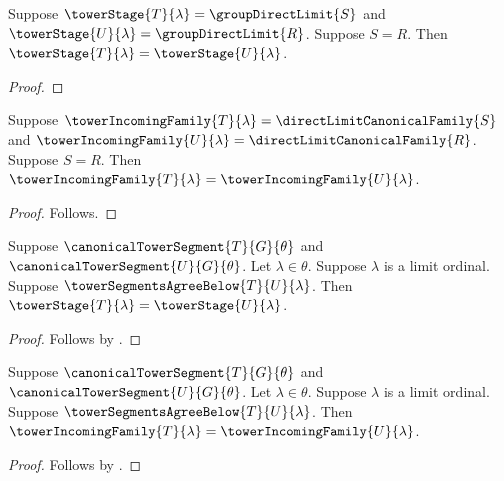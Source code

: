\begin{proposition}\label{tower_limit_stage_comparison_from_systems}
    Suppose $\towerStage{T}{\lambda}=\groupDirectLimit{S}$ and
        $\towerStage{U}{\lambda}=\groupDirectLimit{R}$.
    Suppose $S=R$.
    Then $\towerStage{T}{\lambda}=\towerStage{U}{\lambda}$.
\end{proposition}
\begin{proof}
\end{proof}

\begin{proposition}\label{tower_limit_incoming_comparison_from_systems}
    Suppose $\towerIncomingFamily{T}{\lambda}=
        \directLimitCanonicalFamily{S}$ and
        $\towerIncomingFamily{U}{\lambda}=
            \directLimitCanonicalFamily{R}$.
    Suppose $S=R$.
    Then $\towerIncomingFamily{T}{\lambda}=
        \towerIncomingFamily{U}{\lambda}$.
\end{proposition}
\begin{proof}
    Follows.
\end{proof}

\begin{proposition}\label{canonical_tower_limit_stage_agreement}
    Suppose $\canonicalTowerSegment{T}{G}{\theta}$ and
        $\canonicalTowerSegment{U}{G}{\theta}$.
    Let $\lambda\in\theta$.
    Suppose $\lambda$ is a limit ordinal.
    Suppose $\towerSegmentsAgreeBelow{T}{U}{\lambda}$.
    Then $\towerStage{T}{\lambda}=\towerStage{U}{\lambda}$.
\end{proposition}
\begin{proof}
    Follows by
        .
\end{proof}

\begin{proposition}\label{canonical_tower_limit_incoming_agreement}
    Suppose $\canonicalTowerSegment{T}{G}{\theta}$ and
        $\canonicalTowerSegment{U}{G}{\theta}$.
    Let $\lambda\in\theta$.
    Suppose $\lambda$ is a limit ordinal.
    Suppose $\towerSegmentsAgreeBelow{T}{U}{\lambda}$.
    Then $\towerIncomingFamily{T}{\lambda}=
        \towerIncomingFamily{U}{\lambda}$.
\end{proposition}
\begin{proof}
    Follows by
        .
\end{proof}

